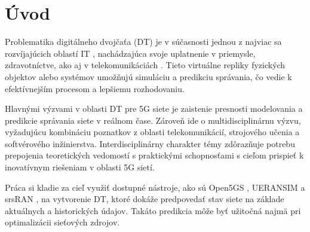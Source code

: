 \chapter{Úvod}
\par{
Problematika digitálneho dvojčaťa (DT) je v súčasnosti jednou z najviac sa rozvíjajúcich oblastí IT \cite{DimensionOfDTAplication}, nachádzajúca svoje uplatnenie v priemysle, zdravotníctve, ako aj v telekomunikáciách \cite{AplicationsOfDT}. Tieto virtuálne repliky fyzických objektov alebo systémov umožňujú simuláciu a predikciu správania, čo vedie k efektívnejším procesom a lepšiemu rozhodovaniu.
}

\par{
Hlavnými výzvami v oblasti DT pre 5G siete je zaistenie presnosti modelovania a predikcie správania siete v reálnom čase. Zároveň ide o multidisciplinárnu výzvu, vyžadujúcu kombináciu poznatkov z oblasti telekomunikácií, strojového učenia a softvérového inžinierstva. Interdisciplinárny charakter témy zdôrazňuje potrebu prepojenia teoretických vedomostí s praktickými schopnosťami s cieľom prispieť k inovatívnym riešeniam v oblasti 5G sietí.
}
\par{
Práca si kladie za cieľ využiť dostupné nástroje, ako sú Open5GS \cite{open5gs}, UERANSIM \cite{ueransim} a srsRAN \cite{srsran}, na vytvorenie DT, ktoré dokáže predpovedať stav siete na základe aktuálnych a historických údajov. Takáto predikcia môže byť užitočná najmä pri optimalizácii sieťových zdrojov.
}